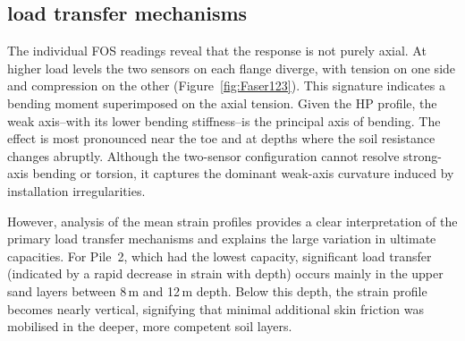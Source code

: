 {{{{{{%






\subsection{load transfer mechanisms}
\label{subsec:load_transfer_mechanisms}

The individual FOS readings reveal that the response is not purely axial.
At higher load levels the two sensors on each flange diverge, with tension on one side and compression on the other (Figure~\ref{fig:Faser123}).
This signature indicates a bending moment superimposed on the axial tension.
Given the HP profile, the weak axis--with its lower bending stiffness--is the principal axis of bending.
The effect is most pronounced near the toe and at depths where the soil resistance changes abruptly.
Although the two-sensor configuration cannot resolve strong-axis bending or torsion, it captures the dominant weak-axis curvature induced by installation irregularities.

However, analysis of the mean strain profiles provides a clear interpretation of the primary load transfer mechanisms and explains the large variation in ultimate capacities. For Pile~2, which had the lowest capacity, significant load transfer (indicated by a rapid decrease in strain with depth) occurs mainly in the upper sand layers between 8\,m and 12\,m depth. Below this depth, the strain profile becomes nearly vertical, signifying that minimal additional skin friction was mobilised in the deeper, more competent soil layers.

}}}}}}
